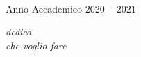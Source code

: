 \vfill

\begin{center}
	\hrulefill \\
	\small Anno Accademico $2020-2021$ \\ 
\end{center}

\cleardoublepage
\thispagestyle{empty}
\begin{flushright}
	\itshape dedica\\
	che voglio fare
\end{flushright}
\cleardoublepage
